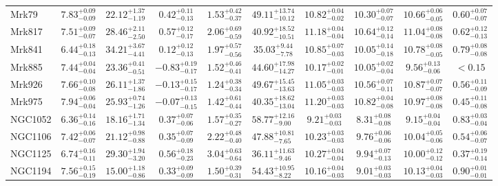 \documentclass[onecolumn]{mn2e}
\begin{document}
\begin{landscape}
{\begin{center}
\begin{longtable}{lccccccccc}
Mrk79 & $7.83_{-0.09}^{+0.09}$ & $22.12_{-1.19}^{+1.37}$ & $0.42_{-0.13}^{+0.11}$ & $1.53_{-0.37}^{+0.42}$ &$49.11_{-10.12}^{+13.74}$ & $10.82_{-0.02}^{+0.04}$ & $10.30_{-0.07}^{+0.07}$ & $10.66_{-0.05}^{+0.06}$ & $0.60_{-0.07}^{+0.07}$ \\
Mrk817 & $7.51_{-0.07}^{+0.09}$ & $28.46_{-2.50}^{+2.11}$ & $0.57_{-0.17}^{+0.12}$ & $2.06_{-0.59}^{+0.69}$ &$40.92_{-10.51}^{+18.52}$ & $11.18_{-0.04}^{+0.04}$ & $10.64_{-0.14}^{+0.12}$ & $11.04_{-0.08}^{+0.08}$ & $0.62_{-0.13}^{+0.12}$ \\
Mrk841 & $6.44_{-0.13}^{+0.18}$ & $34.21_{-4.41}^{+3.67}$ & $0.12_{-0.13}^{+0.12}$ & $1.97_{-0.56}^{+0.57}$ &$35.03_{-7.78}^{+9.44}$ & $10.85_{-0.03}^{+0.07}$ & $10.05_{-0.18}^{+0.14}$ & $10.78_{-0.05}^{+0.08}$ & $0.79_{-0.08}^{+0.08}$ \\
Mrk885 & $7.44_{-0.04}^{+0.04}$ & $23.36_{-0.51}^{+0.41}$ & $-0.83_{-0.17}^{+0.19}$ & $1.52_{-0.41}^{+0.46}$ &$44.60_{-14.27}^{+17.98}$ & $10.17_{-0.01}^{+0.02}$ & $10.05_{-0.04}^{+0.02}$ & $9.56_{-0.06}^{+0.13}$ & $<0.15$ \\
Mrk926 & $7.66_{-0.08}^{+0.10}$ & $26.11_{-1.86}^{+1.37}$ & $-0.13_{-0.17}^{+0.15}$ & $1.24_{-0.34}^{+0.38}$ &$49.67_{-13.63}^{+15.45}$ & $11.05_{-0.03}^{+0.03}$ & $10.56_{-0.11}^{+0.07}$ & $10.87_{-0.07}^{+0.07}$ & $0.56_{-0.09}^{+0.11}$ \\
Mrk975 & $7.94_{-0.04}^{+0.06}$ & $25.93_{-1.26}^{+0.74}$ & $-0.07_{-0.15}^{+0.13}$ & $1.42_{-0.44}^{+0.61}$ &$40.35_{-13.04}^{+18.62}$ & $11.20_{-0.03}^{+0.03}$ & $10.82_{-0.08}^{+0.04}$ & $10.97_{-0.08}^{+0.08}$ & $0.45_{-0.08}^{+0.11}$ \\
NGC1052 & $6.36_{-0.16}^{+0.14}$ & $18.16_{-1.34}^{+1.71}$ & $0.37_{-0.06}^{+0.07}$ & $1.57_{-0.27}^{+0.35}$ &$58.77_{-9.00}^{+12.16}$ & $9.21_{-0.03}^{+0.03}$ & $8.31_{-0.08}^{+0.08}$ & $9.15_{-0.04}^{+0.04}$ & $0.83_{-0.04}^{+0.03}$ \\
NGC1106 & $7.42_{-0.07}^{+0.06}$ & $21.12_{-0.88}^{+0.98}$ & $0.35_{-0.09}^{+0.07}$ & $2.22_{-0.40}^{+0.48}$ &$47.88_{-7.65}^{+10.81}$ & $10.23_{-0.03}^{+0.03}$ & $9.76_{-0.06}^{+0.06}$ & $10.04_{-0.06}^{+0.05}$ & $0.54_{-0.07}^{+0.06}$ \\
NGC1125 & $6.74_{-0.11}^{+0.16}$ & $29.30_{-3.20}^{+1.94}$ & $0.56_{-0.23}^{+0.18}$ & $3.04_{-0.64}^{+0.63}$ &$36.11_{-9.46}^{+11.63}$ & $10.27_{-0.04}^{+0.04}$ & $9.94_{-0.13}^{+0.07}$ & $10.00_{-0.12}^{+0.12}$ & $0.37_{-0.14}^{+0.19}$ \\
NGC1194 & $7.56_{-0.19}^{+0.15}$ & $15.00_{-0.86}^{+1.18}$ & $0.33_{-0.09}^{+0.09}$ & $1.50_{-0.31}^{+0.39}$ &$54.43_{-8.22}^{+10.95}$ & $10.16_{-0.03}^{+0.04}$ & $9.01_{-0.03}^{+0.03}$ & $10.13_{-0.03}^{+0.04}$ & $0.90_{-0.01}^{+0.01}$ \\

\end{longtable}
\end{center}}
\end{landscape}
\end{document}
